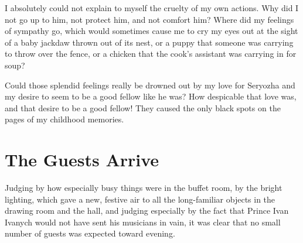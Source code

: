 I absolutely could not explain to myself the cruelty of my own actions. Why did I not go up to him, not protect him, and not comfort him? Where did my feelings of sympathy go, which would sometimes cause me to cry my eyes out at the sight of a baby jackdaw thrown out of its nest, or a puppy that someone was carrying to throw over the fence, or a chicken that the cook's assistant was carrying in for soup?

Could those splendid feelings really be drowned out by my love for Seryozha and my desire to seem to be a good fellow like he was? How despicable that love was, and that desire to be a good fellow! They caused the only black spots on the pages of my childhood memories.

\chapter{The Guests Arrive} %

Judging by how especially busy things were in the buffet room, by the bright lighting, which gave a new, festive air to all the long-familiar objects in the drawing room and the hall, and judging especially by the fact that Prince Ivan Ivanych would not have sent his musicians in vain, it was clear that no small number of guests was expected toward evening.

